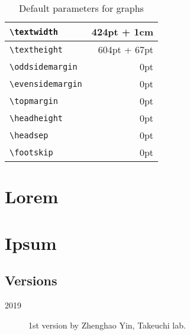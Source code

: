 \documentclass{kuee_en}
\begin{document}
\begin{table}
  \caption{Default parameters for graphs}\label{tab:fig}
  \begin{center}
    \begin{tabular}{|l|r|}
      \hline
      \verb+\textwidth+ & 424pt + 1cm \\ \hline
      \verb+\textheight+ & 604pt + 67pt \\ \hline
      \verb+\oddsidemargin+ & 0pt \\ \hline
      \verb+\evensidemargin+ & 0pt \\ \hline
      \verb+\topmargin+ & 0pt \\ \hline
      \verb+\headheight+ & 0pt \\ \hline
      \verb+\headsep+ & 0pt \\ \hline
      \verb+\footskip+ & 0pt \\ \hline
    \end{tabular}
  \end{center}
\end{table}


\chapter{Lorem}
\lipsum[2-5]

\chapter{Ipsum}
\lipsum[4-8]

\begin{acknowledgements}
\lipsum[2]
\end{acknowledgements}

\printbibliography[title=References,heading=bibintoc]

\clearpage %
\processdelayedfloats
\clearpage

\begin{appendices}
\chapter{Versions}
\begin{description}
  \item[2019] 1st version by Zhenghao Yin, Takeuchi lab.
\end{description}
\end{appendices}
\end{document}
